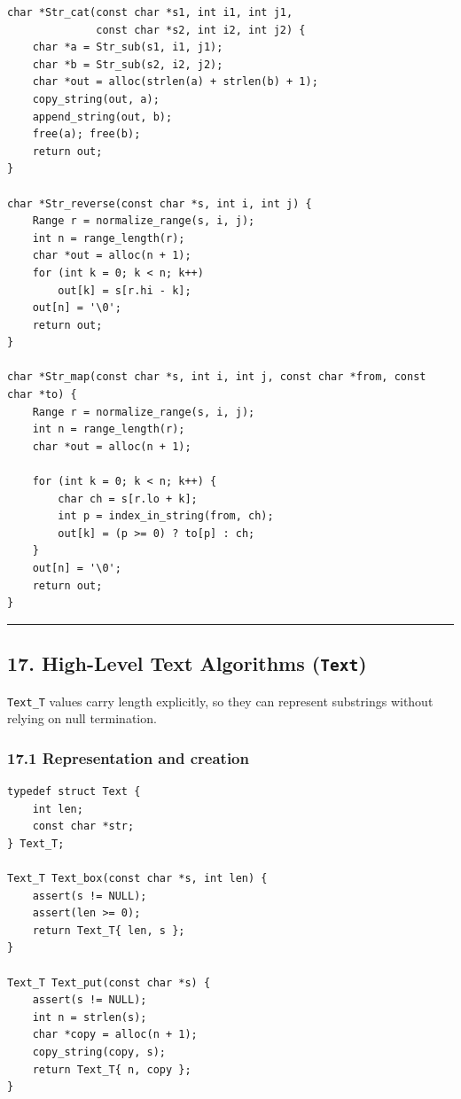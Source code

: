 \documentclass[11pt]{article}
\begin{document}
\begin{verbatim}
char *Str_cat(const char *s1, int i1, int j1,
              const char *s2, int i2, int j2) {
    char *a = Str_sub(s1, i1, j1);
    char *b = Str_sub(s2, i2, j2);
    char *out = alloc(strlen(a) + strlen(b) + 1);
    copy_string(out, a);
    append_string(out, b);
    free(a); free(b);
    return out;
}

char *Str_reverse(const char *s, int i, int j) {
    Range r = normalize_range(s, i, j);
    int n = range_length(r);
    char *out = alloc(n + 1);
    for (int k = 0; k < n; k++)
        out[k] = s[r.hi - k];
    out[n] = '\0';
    return out;
}

char *Str_map(const char *s, int i, int j, const char *from, const char *to) {
    Range r = normalize_range(s, i, j);
    int n = range_length(r);
    char *out = alloc(n + 1);

    for (int k = 0; k < n; k++) {
        char ch = s[r.lo + k];
        int p = index_in_string(from, ch);
        out[k] = (p >= 0) ? to[p] : ch;
    }
    out[n] = '\0';
    return out;
}
\end{verbatim}

\begin{center}\rule{0.5\linewidth}{0.5pt}\end{center}

\subsection{\texorpdfstring{17. High-Level Text Algorithms (\texttt{Text})}{17. High-Level Text Algorithms (Text)}}\label{high-level-text-algorithms-text}

\texttt{Text\_T} values carry length explicitly, so they can represent substrings without relying on null termination.

\subsubsection{17.1 Representation and creation}\label{representation-and-creation}

\begin{verbatim}
typedef struct Text {
    int len;
    const char *str;
} Text_T;

Text_T Text_box(const char *s, int len) {
    assert(s != NULL);
    assert(len >= 0);
    return Text_T{ len, s };
}

Text_T Text_put(const char *s) {
    assert(s != NULL);
    int n = strlen(s);
    char *copy = alloc(n + 1);
    copy_string(copy, s);
    return Text_T{ n, copy };
}
\end{verbatim}
\end{document}
